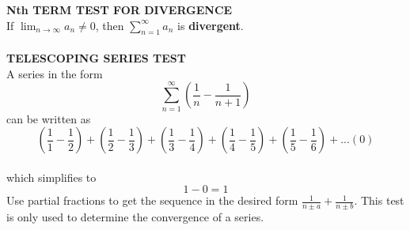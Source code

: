 \documentclass[10pt]{article}
\begin{document}
\textbf{Nth TERM TEST FOR DIVERGENCE}\\
If $\lim_{n\to \infty}a_n\ne 0$, then $\sum_{n=1}^{\infty}a_n$ is \textbf{divergent}.
\\\\
\textbf{TELESCOPING SERIES TEST}\\
A series in the form $$\sum_{n=1}^{\infty}(\frac{1}{n}-\frac{1}{n+1})$$ can be written as $$(\frac{1}{1}-\frac{1}{2})+(\frac{1}{2}-\frac{1}{3})+(\frac{1}{3}-\frac{1}{4})+(\frac{1}{4}-\frac{1}{5})+(\frac{1}{5}-\frac{1}{6})+...(0)$$\\
which simplifies to $$1-0=1$$
Use partial fractions to get the sequence in the desired form $\frac{1}{n\pm{a}}+\frac{1}{n\pm{b}}$. This test is only used to determine the convergence of a series.
\end{document}
